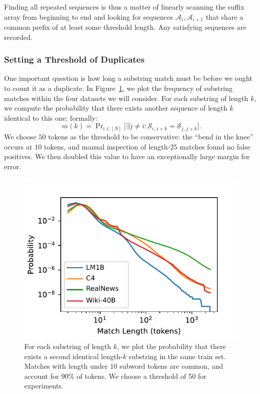 Finding all repeated sequences is thus a matter of linearly scanning the suffix array from
beginning to end and looking for sequences $\mathcal{A}_i, \mathcal{A}_{i+1}$ that share a common prefix of
at least some threshold length.
%
Any satisfying sequences are recorded.
%

\subsubsection{Setting a Threshold of Duplicates}
\label{section:exact_thresh}
One important question is how long a substring match must be before we ought to count it as a duplicate.
%
In Figure~\ref{fig:suffix-match-len}, we plot the frequency of substring matches within the four datasets we will
consider.
For each substring of length $k$, we compute the probability that there exists another sequence of length $k$ identical to this one; formally:
\[m(k) = \mathop{\text{Pr}}_{i \in [N]}\big[ \exists j \ne i : \mathcal{S}_{i..i+k} = \mathcal{S}_{j..j+k}\big].\]
We choose $50$ tokens as the threshold to be conservative:
the ``bend in the knee'' occurs at $10$ tokens, and manual inspection of
length-$25$ matches found no false positives.
We then doubled this value to have an exceptionally large margin for error.

\begin{figure}
    \centering
    \includegraphics[scale=.8]{figures/match_length.pdf}
    \caption{For each substring of length $k$,
    we plot the probability that there exists a second identical length-$k$ substring in the same train set.
    Matches with length under $10$ subword tokens are common, and account for $90\%$ of tokens.
    We choose a threshold of 50 for experiments.
    }
    \label{fig:suffix-match-len}
\end{figure}


